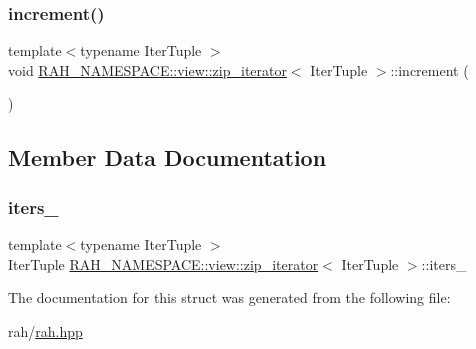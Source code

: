 \mbox{\label{struct_r_a_h___n_a_m_e_s_p_a_c_e_1_1view_1_1zip__iterator_a8c0c1f446f53392f0ce0305671b42bab}} 
\subsubsection{\texorpdfstring{increment()}{increment()}}
{\footnotesize\ttfamily template$<$typename Iter\+Tuple $>$ \\
void \mbox{\hyperlink{struct_r_a_h___n_a_m_e_s_p_a_c_e_1_1view_1_1zip__iterator}{R\+A\+H\+\_\+\+N\+A\+M\+E\+S\+P\+A\+C\+E\+::view\+::zip\+\_\+iterator}}$<$ Iter\+Tuple $>$\+::increment (\begin{DoxyParamCaption}{ }\end{DoxyParamCaption})\hspace{0.3cm}{\ttfamily [inline]}}



\subsection{Member Data Documentation}
\mbox{\label{struct_r_a_h___n_a_m_e_s_p_a_c_e_1_1view_1_1zip__iterator_aa562f95c73160c0980abbbedd2faf4c1}} 
\subsubsection{\texorpdfstring{iters\_}{iters\_}}
{\footnotesize\ttfamily template$<$typename Iter\+Tuple $>$ \\
Iter\+Tuple \mbox{\hyperlink{struct_r_a_h___n_a_m_e_s_p_a_c_e_1_1view_1_1zip__iterator}{R\+A\+H\+\_\+\+N\+A\+M\+E\+S\+P\+A\+C\+E\+::view\+::zip\+\_\+iterator}}$<$ Iter\+Tuple $>$\+::iters\+\_\+}



The documentation for this struct was generated from the following file\+:\begin{DoxyCompactItemize}
\item 
rah/\mbox{\hyperlink{rah_8hpp}{rah.\+hpp}}\end{DoxyCompactItemize}
